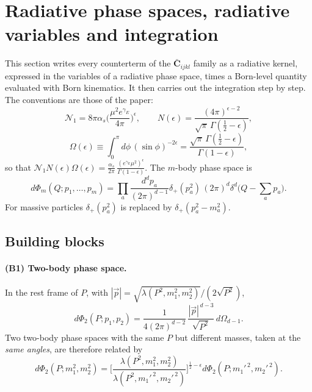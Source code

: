 \documentclass[11pt,a4paper]{article}
\newcommand{\bbC}[1]{\bar{\mathbf C}_{#1}}
\newcommand{\eps}{\epsilon}
\begin{document}
\section{Radiative phase spaces, radiative variables and integration}
\label{sec:ps}

This section writes every counterterm of the $\bbC{ijkl}$ family as a radiative kernel, expressed in
the variables of a radiative phase space, times a Born-level quantity evaluated with Born kinematics.
It then carries out the integration step by step. The conventions are those of the paper:
\begin{equation}
\mathcal N_1=8\pi\alpha_s\Big(\frac{\mu^2e^{\gamma_E}}{4\pi}\Big)^{\eps},
\qquad
N(\eps)=\frac{(4\pi)^{\eps-2}}{\sqrt\pi\,\Gamma(\frac12-\eps)},
\end{equation}
\begin{equation}
\Omega(\eps)\equiv\int_0^\pi\!d\phi\,(\sin\phi)^{-2\eps}=\frac{\sqrt\pi\,\Gamma(\frac12-\eps)}{\Gamma(1-\eps)},
\end{equation}
so that $\mathcal N_1N(\eps)\Omega(\eps)=\frac{\alpha_s}{2\pi}\,\frac{(e^{\gamma_E}\mu^2)^{\eps}}{\Gamma(1-\eps)}$.
The $m$-body phase space is
\begin{equation}
d\Phi_m(Q;p_1,\dots,p_m)=\prod_a\frac{d^dp_a}{(2\pi)^{d-1}}\delta_+(p_a^2)\,(2\pi)^d\delta^d\Big(Q-\sum_ap_a\Big).
\end{equation}
For massive particles $\delta_+(p_a^2)$ is replaced by $\delta_+(p_a^2-m_a^2)$.

\subsection{Building blocks}
\label{sec:blocks}

\paragraph{(B1) Two-body phase space.} In the rest frame of $P$, with $|\vec p|=\sqrt{\lambda(P^2,m_1^2,m_2^2)}/(2\sqrt{P^2})$,
\begin{equation}
d\Phi_2(P;p_1,p_2)=\frac{1}{4(2\pi)^{d-2}}\,\frac{|\vec p|^{\,d-3}}{\sqrt{P^2}}\,d\Omega_{d-1}.
\label{eq:B1}
\end{equation}
Two two-body phase spaces with the same $P$ but different masses, taken at the \emph{same angles}, are therefore related by
\begin{equation}
d\Phi_2(P;m_1^2,m_2^2)=\bigg[\frac{\lambda(P^2,m_1^2,m_2^2)}{\lambda(P^2,m_1'^{\,2},m_2'^{\,2})}\bigg]^{\frac12-\eps}d\Phi_2(P;m_1'^{\,2},m_2'^{\,2}).
\label{eq:B1ratio}
\end{equation}
\end{document}
